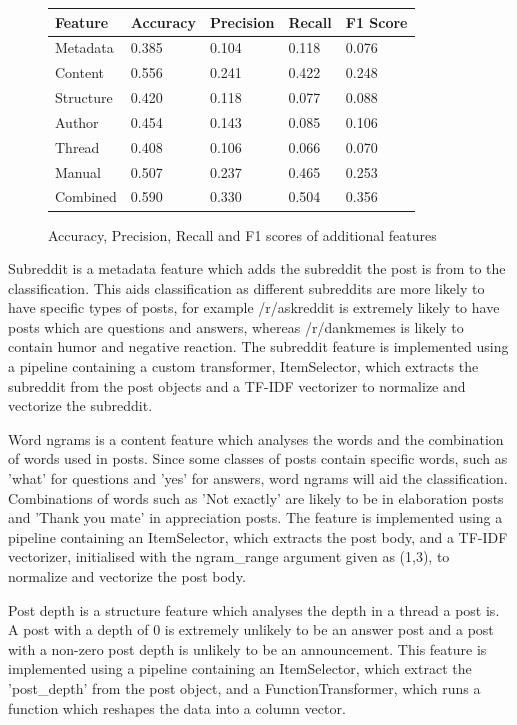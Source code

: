 \documentclass[10pt, a4paper]{article}
\begin{document}
\begin{figure}[H]
	\caption{Accuracy, Precision, Recall and F1 scores of additional features}
	\begin{center}
		\begin{tabulary}{\textwidth}{|L|L|L|L|L|}
			\hline
			Feature   & Accuracy & Precision & Recall & F1 Score \\
			\hline
			Metadata  & 0.385    & 0.104     & 0.118  & 0.076 \\
			Content   & 0.556    & 0.241     & 0.422  & 0.248 \\
			Structure & 0.420    & 0.118     & 0.077  & 0.088 \\
			Author    & 0.454    & 0.143     & 0.085  & 0.106 \\
			Thread    & 0.408    & 0.106     & 0.066  & 0.070 \\
			Manual    & 0.507    & 0.237     & 0.465  & 0.253 \\
			\hline
			Combined  & 0.590    & 0.330     & 0.504  & 0.356 \\
			\hline
		\end{tabulary}
	\end{center}
\end{figure}

Subreddit is a metadata feature which adds the subreddit the post is from to the classification.
This aids classification as different subreddits are more likely to have specific types of posts, for example
/r/askreddit is extremely likely to have posts which are questions and answers, whereas /r/dankmemes is likely
to contain humor and negative reaction.
The subreddit feature is implemented using a pipeline containing a custom transformer, ItemSelector, which extracts the subreddit 
from the post objects and a TF-IDF vectorizer to normalize and vectorize the subreddit.

Word ngrams is a content feature which analyses the words and the combination of words used in posts.
Since some classes of posts contain specific words, such as 'what' for questions and 'yes' for answers, word ngrams will aid the classification.
Combinations of words such as 'Not exactly' are likely to be in elaboration posts and 'Thank you mate' in appreciation posts.
The feature is implemented using a pipeline containing an ItemSelector, which extracts the post body, and a TF-IDF vectorizer, 
initialised with the ngram\_range argument given as (1,3), to normalize and vectorize the post body.

Post depth is a structure feature which analyses the depth in a thread a post is.
A post with a depth of 0 is extremely unlikely to be an answer post and a post with a non-zero post depth is unlikely to be an announcement.
This feature is implemented using a pipeline containing an ItemSelector, which extract the 'post\_depth' from the post object, and a
FunctionTransformer, which runs a function which reshapes the data into a column vector.
\end{document}
